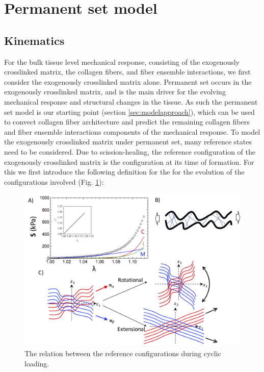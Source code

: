 \section{Permanent set model}

\subsection{Kinematics}

	For the bulk tissue level mechanical response, consisting of the exogenously crosslinked matrix, the collagen fibers, and fiber ensemble interactions, we first consider the exogenously crosslinked matrix alone.
	Permanent set occurs in the exogenously crosslinked matrix, and is the main driver for the evolving mechanical response and structural changes in the tissue. 
	As such the permanent set model is our starting point (section \ref{sec:modelapproach}), which can be used to convect collagen fiber architecture and predict the remaining collagen fibers and fiber ensemble interactions components of the mechanical response. 
	To model the exogenously crosslinked matrix under permanent set, many reference states need to be considered.
	Due to scission-healing, the reference configuration of the exogenously crosslinked matrix is the configuration at its time of formation. 
	For this we first introduce the following definition for the for the evolution of the configurations involved (Fig. \ref{fig:stateevolution}):

\begin{figure}[hbt]
\centering
\includegraphics[width=0.35\paperwidth]{Images/chapter4/figure6}
\caption{The relation between the reference configurations during cyclic loading.}
\label{fig:stateevolution}
\end{figure}

